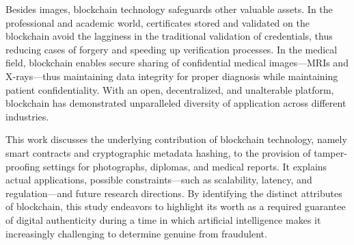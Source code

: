 Besides images, blockchain technology safeguards other valuable assets. In the professional and
academic world, certificates stored and validated on the blockchain avoid the lagginess in the
traditional validation of credentials, thus reducing cases of forgery and speeding up verification
processes. In the medical field, blockchain enables secure sharing of confidential medical images---MRIs
and X-rays---thus maintaining data integrity for proper diagnosis while maintaining patient
confidentiality. With an open, decentralized, and unalterable platform, blockchain has demonstrated
unparalleled diversity of application across different industries.

This work discusses the underlying contribution of blockchain technology, namely smart contracts and
cryptographic metadata hashing, to the provision of tamper-proofing settings for photographs, diplomas,
and medical reports. It explains actual applications, possible constraints---such as scalability,
latency, and regulation---and future research directions. By identifying the distinct attributes of
blockchain, this study endeavors to highlight its worth as a required guarantee of digital authenticity
during a time in which artificial intelligence makes it increasingly challenging to determine genuine
from fraudulent.

